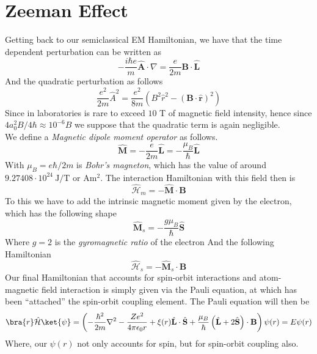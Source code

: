 \documentclass[a4paper, 11pt]{book}
\renewcommand{\vec}[1]{\mathbf{#1}}
\newcommand{\1}{\opr{\mathds{1}}}
\newcommand{\ham}{\mathcal{H}}
\newcommand{\opr}[1]{\hat{#1}}
\newcommand{\vecopr}[1]{\opr{\vec{#1}}}
\theoremstyle{plain}
\begin{document}
	\section{Zeeman Effect}
	Getting back to our semiclassical EM Hamiltonian, we have that the time dependent perturbation can be written as
	\begin{equation*}
		-\frac{i\hbar e}{m}\vecopr{A}\cdot\nabla=\frac{e}{2m}\vec{B}\cdot\vecopr{L}
	\end{equation*}
	And the quadratic perturbation as follows
	\begin{equation*}
		\frac{e^2}{2m}\opr{A}^2=\frac{e^2}{8m}\left( B^2\opr{r}^2-(\vec{B}\cdot\vecopr{r})^2 \right)
	\end{equation*}
	Since in laboratories is rare to exceed $10$ T of magnetic field intensity, hence since $4a_0^2B/4\hbar\approx 10^{-6}B$ we suppose that the quadratic term is again negligible.\\
	We define a \textit{Magnetic dipole moment operator} as follows.\\
	\begin{equation}
		\vecopr{M}=-\frac{e}{2m}\vecopr{L}=-\frac{\mu_B}{\hbar}\vecopr{L}
		\label{eq:mmomopr}
	\end{equation}
	With $\mu_B=e\hbar/2m$ is \textit{Bohr's magneton}, which has the value of around $9.27408\cdot10^{24}\ \mathrm{J/T}$ or $\mathrm{Am^2}$. The interaction Hamiltonian with this field then is
	\begin{equation}
		\opr{\ham}_{m}=-\vecopr{M}\cdot\vec{B}
		\label{eq:interactionhammag}
	\end{equation}
	To this we have to add the intrinsic magnetic moment given by the electron, which has the following shape
	\begin{equation}
		\vecopr{M}_s=-\frac{g\mu_B}{\hbar}\vecopr{S}
		\label{eq:spinmmopr}
	\end{equation}
	Where $g=2$ is the \textit{gyromagnetic ratio} of the electron
	And the following Hamiltonian
	\begin{equation}
		\opr{\ham}_s=-\vecopr{M}_s\cdot\vec{B}
		\label{eq:interactionhamspin}
	\end{equation}
	Our final Hamiltonian that accounts for spin-orbit interactions and atom-magnetic field interaction is simply given via the Pauli equation, at which has been ``attached'' the spin-orbit coupling element. The Pauli equation will then be
	\begin{equation}
		\bra{r}\opr{\ham}\ket{\psi}=\left( -\frac{\hbar^2}{2m}\nabla^2-\frac{Ze^2}{4\pi\epsilon_0r}+\xi(r)\vecopr{L}\cdot\vecopr{S}+\frac{\mu_B}{\hbar}\left( \vecopr{L}+2\vecopr{S} \right)\cdot\vec{B} \right)\psi(r)=E\psi(r)
		\label{eq:sopauliequation}
	\end{equation}
	Where, our $\psi(r)$ not only accounts for spin, but for spin-orbit coupling also.
\end{document}
